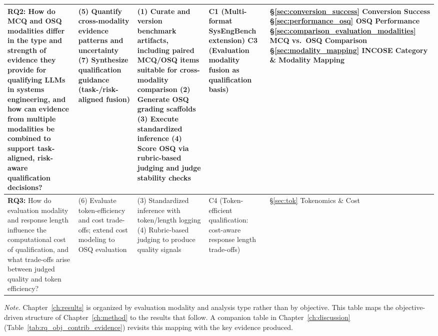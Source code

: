 \begin{landscape}
\begin{table}[htbp]
\begin{tabularx}{\linewidth}{p{2.8cm} X X p{2.6cm} p{3.6cm}}
\textbf{RQ2:} How do MCQ and OSQ modalities differ in the type and strength of evidence they provide for qualifying LLMs in systems engineering, and how can evidence from multiple modalities be combined to support task-aligned, risk-aware qualification decisions? &
(5) Quantify cross-modality evidence patterns and uncertainty\newline
(7) Synthesize qualification guidance (task-/risk-aligned fusion) &
(1) Curate and version benchmark artifacts, including paired MCQ/OSQ items suitable for cross-modality comparison\newline
(2) Generate OSQ grading scaffolds\newline
(3) Execute standardized inference\newline
(4) Score OSQ via rubric-based judging and judge stability checks &
C1 (Multi-format SysEngBench extension)\newline
C3 (Evaluation modality fusion as qualification basis) &
\S\ref{sec:conversion_success} Conversion Success\newline
\S\ref{sec:performance_osq} OSQ Performance\newline
\S\ref{sec:comparison_evaluation_modalities} MCQ vs.\ OSQ Comparison\newline
\S\ref{sec:modality_mapping} INCOSE Category \& Modality Mapping \\
\midrule

\textbf{RQ3:} How do evaluation modality and response length influence the computational cost of qualification, and what trade-offs arise between judged quality and token efficiency? &
(6) Evaluate token-efficiency and cost trade-offs; extend cost modeling to OSQ evaluation &
(3) Standardized inference with token/length logging\newline
(4) Rubric-based judging to produce quality signals &
C4 (Token-efficient qualification: cost-aware response length trade-offs) &
\S\ref{sec:tok} Tokenomics \& Cost \\
\bottomrule
\end{tabularx}

\vspace{4pt}
\noindent\textit{Note.} Chapter~\ref{ch:results} is organized by evaluation modality and analysis type rather than by objective. This table maps the objective-driven structure of Chapter~\ref{ch:method} to the results that follow. A companion table in Chapter~\ref{ch:discussion} (Table~\ref{tab:rq_obj_contrib_evidence}) revisits this mapping with the key evidence produced.
\end{table}
\end{landscape}
